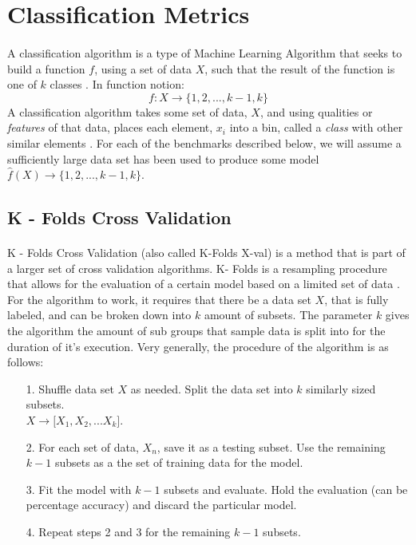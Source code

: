 \documentclass[12pt,letterpaper]{article}
\begin{document}
\section{Classification Metrics}
\paragraph*{}A classification algorithm is a type of Machine Learning Algorithm that seeks to build a function $f$, using a set of data $X$, such that the result of the function is one of $k$ classes \cite{Petrik}. In function notion:
\begin{equation}
\label{classification function}
f: X \rightarrow \{1,2,...,k-1,k\}
\end{equation}
A classification algorithm takes some set of data, $X$, and using qualities or \textit{features} of that data, places each element, $x_i$ into a bin, called a \textit{class} with other similar elements \cite{Geron}. For each of the benchmarks described below, we will assume a sufficiently large data set has been used to produce some model $\hat{f}(X) \rightarrow \{1,2,...,k-1,k\}$.


\subsection{K - Folds Cross Validation}
\paragraph*{} K - Folds Cross Validation (also called K-Folds X-val) is a method that is part of a larger set of cross validation algorithms. K- Folds is a resampling procedure that allows for the evaluation of a certain model based on a limited set of data \cite{Brownlee}. For the algorithm to work, it requires that there be a data set $X$, that is fully labeled, and can be broken down into $k$ amount of subsets. The parameter $k$ gives the algorithm the amount of sub groups that sample data is split into for the duration of it's execution. Very generally, the procedure of the algorithm is as follows:
\begin{enumerate}
\item[1.]Shuffle data set $X$ as needed. Split the data set into $k$ similarly sized subsets. \\$X \rightarrow \big[ X_1 , X_2 , ... X_k \big]$.
\item[2.]For each set of data, $X_n$, save it as a testing subset. Use the remaining $k-1$ subsets as a the set of training data for the model.
\item[3.]Fit the model with $k-1$ subsets and evaluate. Hold the evaluation (can be percentage accuracy) and discard the particular model.
\item[4.]Repeat steps 2 and 3 for the remaining $k-1$ subsets.
\end{enumerate}
\end{document}
